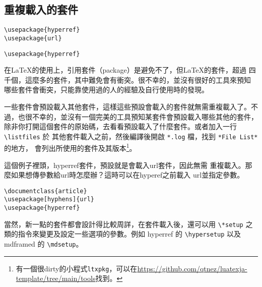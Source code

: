\subsection{重複載入的套件}

\begin{Wrong}
\begin{verbatim}
\usepackage{hyperref}
\usepackage{url}
\end{verbatim}

\end{Wrong}

\begin{Right}
\begin{verbatim}
\usepackage{hyperref}
\end{verbatim}

\end{Right}

在\LaTeX 的使用上，引用套件（package）是避免不了，但\LaTeX 的套件，超過
四千個，這麼多的套件，其中難免會有衝突。很不幸的，並沒有很好的工具來預知
哪些套件會衝突，只能靠使用過的人的經驗及自行使用時的發現。

一些套件會預設載入其他套件，這樣這些預設會載入的套件就無需重複載入了。不
過，也很不幸的，並沒有一個完美的工具預知某套件會預設載入哪些其他的套件，
除非你打開這個套件的原始碼，去看看預設載入了什麼套件。或者加入一行 \verb|\listfiles| 於
其他套件載入之前，然後編譯後開啟 \verb|*.log| 檔，找到 \verb|*File List*| 的地方，
會列出所使用的套件及其版本\footnote{有一個很dirty的小程式{\tt ltxpkg}，可以在\url{https://github.com/qtnez/luatexja-template/tree/main/tools}找到。}。

這個例子裡頭，{\sf hyperref}套件，預設就是會載入{\sf url}套件，因此無需
重複載入。那麼如果想傳參數給{\sf url}時怎麼辦？這時可以在{\sf hyperef}之前載入
{\sf url}並指定參數。

\begin{Code}
\begin{verbatim}
\documentclass{article}
\usepackage[hyphens]{url}
\usepackage{hyperref}
\end{verbatim}
\end{Code}

當然，新一點的套件都會設計得比較周詳，在套件載入後，還可以用 \verb|\*setup| 之類的指令來變更及設定一些選項的參數。例如 {\sf hyperref} 的 \verb|\hypersetup| 以及 {\sf mdframed} 的 \verb|\mdsetup|。

\marginpar{\back}
